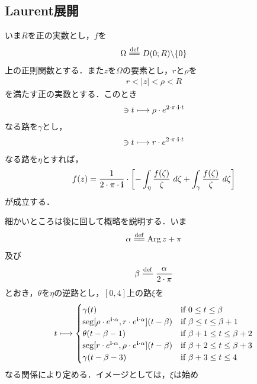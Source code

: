 \subsection{Laurent展開}
	
	いま$R$を正の実数とし，$f$を
	\begin{align}
		\Omega \defeq \disc{0}{R} \backslash \{0\}
	\end{align}
	上の正則関数とする．また$z$を$\Omega$の要素とし，$r$と$\rho$を
	\begin{align}
		r < |z| < \rho < R
	\end{align}
	を満たす正の実数とする．このとき
	\begin{align}
		[0,1] \ni t \longmapsto \rho \cdot e^{2 \cdot \pi \cdot \isym \cdot t}
	\end{align}
	なる路を$\gamma$とし，
	\begin{align}
		[0,1] \ni t \longmapsto r \cdot e^{2 \cdot \pi \cdot \isym \cdot t}
	\end{align}
	なる路を$\eta$とすれば，
	\begin{align}
		f(z) = \frac{1}{2 \cdot \pi \cdot \mathbf{i}} \cdot 
		\left[-\int_{\eta} \frac{f(\zeta)}{\zeta}\ d\zeta + \int_{\gamma} \frac{f(\zeta)}{\zeta}\ d\zeta\right]
		\label{fom:Laurent_series_1}
	\end{align}
	が成立する．
	
	細かいところは後に回して概略を説明する．いま
	\begin{align}
		\alpha \defeq \pvarg{z} + \pi
	\end{align}
	及び
	\begin{align}
		\beta \defeq \frac{\alpha}{2 \cdot \pi}
	\end{align}
	とおき，$\theta$を$\eta$の逆路とし，$[0,4]$上の路$\xi$を
	\begin{align}
		t \longmapsto
		\begin{cases}
			\gamma(t) & \mbox{if } 0 \leq t \leq \beta \\
			\operatorname{seg}[\rho \cdot e^{\mathbf{i} \cdot \alpha},r \cdot e^{\mathbf{i} \cdot \alpha}](t-\beta) & \mbox{if } \beta \leq t \leq \beta + 1 \\
			\theta(t - \beta - 1) & \mbox{if } \beta + 1 \leq t \leq \beta + 2 \\
			 \operatorname{seg}[r \cdot e^{\mathbf{i} \cdot \alpha},\rho \cdot e^{\mathbf{i} \cdot \alpha}](t-\beta) & \mbox{if } \beta + 2 \leq t \leq \beta + 3 \\
			\gamma(t - \beta - 3) & \mbox{if } \beta + 3 \leq t \leq 4
		\end{cases}
	\end{align}
	なる関係により定める．イメージとしては，$\xi$は始め
	
